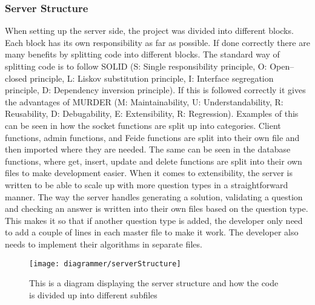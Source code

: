 \subsubsection{Server Structure}
When setting up the server side, the project was divided into different blocks. Each block has its own responsibility as far as possible. If done correctly there are many benefits by splitting code into different blocks. The standard way of splitting code is to follow SOLID (S: Single responsibility principle, O: Open–closed principle, L: Liskov substitution principle, I: Interface segregation principle, D: Dependency inversion principle). If this is followed correctly it gives the advantages of MURDER (M: Maintainability, U: Understandability, R: Reusability, D: Debugability, E: Extensibility, R: Regression). Examples of this can be seen in how the socket functions are split up into categories. Client functions, admin functions, and Feide functions are split into their own file and then imported where they are needed. The same can be seen in the database functions, where get, insert, update and delete functions are split into their own files to make development easier. When it comes to extensibility, the server is written to be able to scale up with more question types in a straightforward manner. The way the server handles generating a solution, validating a question and checking an answer is written into their own files based on the question type. This makes it so that if another question type is added, the developer only need to add a couple of lines in each master file to make it work. The developer also needs to implement their algorithms in separate files.
\begin{figure}[H]
    \centering
    \texttt{[image: diagrammer/serverStructure]}
    \caption{This is a diagram displaying the server structure and how the code is divided up into different subfiles}
    \label{fig:serverStructure}
\end{figure}